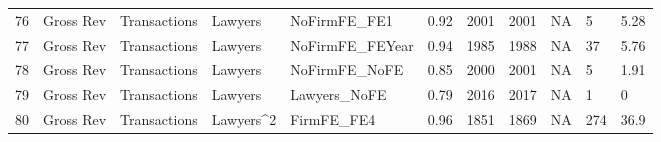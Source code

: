 \begin{table}[ht]
\begin{tabular}{rllllllllll}
  76 & Gross Rev & Transactions & Lawyers & NoFirmFE\_FE1 & 0.92 & 2001 & 2001 & NA & 5 & 5.28 \\ 
  77 & Gross Rev & Transactions & Lawyers & NoFirmFE\_FEYear & 0.94 & 1985 & 1988 & NA & 37 & 5.76 \\ 
  78 & Gross Rev & Transactions & Lawyers & NoFirmFE\_NoFE & 0.85 & 2000 & 2001 & NA & 5 & 1.91 \\ 
  79 & Gross Rev & Transactions & Lawyers & Lawyers\_NoFE & 0.79 & 2016 & 2017 & NA & 1 & 0 \\ 
  80 & Gross Rev & Transactions & Lawyers^2 & FirmFE\_FE4 & 0.96 & 1851 & 1869 & NA & 274 & 36.9 \\ 
   \hline
\end{tabular}
\end{table}
